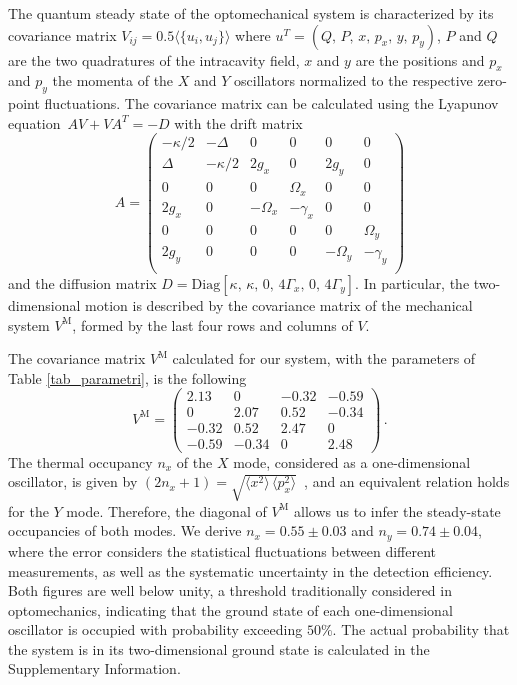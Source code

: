 \documentclass[11pt,floatfix,amssymb,prx,aps,longbibliography,superscriptaddress,nopacs]{revtex4-2}
\newcommand{\Vm}{V^{\scriptscriptstyle{\mathrm{M}}}}
\newcommand{\nX}{n_{\scriptstyle{x}}}
\newcommand{\nY}{n_{\scriptstyle{y}}}
\newcommand{\OmegaX}{\Omega_{\scriptstyle{x}}}
\newcommand{\OmegaY}{\Omega_{\scriptstyle{y}}}
\newcommand{\GY}{\Gamma_{\scriptstyle{y}}}
\newcommand{\GX}{\Gamma_{\scriptstyle{x}}}
\newcommand{\gX}{g_{\scriptstyle{x}}}
\newcommand{\gY}{g_{\scriptstyle{y}}}
\newcommand{\xX}{x}
\newcommand{\xY}{y}
\newcommand{\pX}{p_{\scriptstyle{x}}}
\newcommand{\pY}{p_{\scriptstyle{y}}}
\begin{document}
The quantum steady state of the optomechanical system is characterized by its covariance matrix $V_{ij} = 0.5\langle \{u_i , u_j\} \rangle$ where $u^T = (Q,\,  P,\, \xX,\, \pX,\, \xY,\, \pY)$, $P$ and $Q$ are the two quadratures of the intracavity field, $\xX$ and $\xY$ are the positions and $\pX$ and $\pY$ the momenta of the $X$ and $Y$ oscillators normalized to the respective zero-point fluctuations. The covariance matrix can be calculated using the Lyapunov equation $\,AV+VA^T = -D$ with the drift matrix 
\begin{equation}
    A=
    \left(
    \begin{array}{cccccc}
        -\kappa/2 & -\Delta & 0  & 0 & 0  & 0 \\
         \Delta & -\kappa/2 & 2 \gX  & 0 & 2 \gY  & 0 \\
         0 & 0 & 0  & \OmegaX & 0  & 0 \\
         2 \gX & 0 & -\OmegaX  & -\gamma_x & 0  & 0 \\
         0 & 0 & 0  & 0 & 0  & \OmegaY \\
         2 \gY & 0 & 0  & 0 & -\OmegaY  & -\gamma_y \\
    \end{array}
    \right)
\end{equation}
and the diffusion matrix $D = \mathrm{Diag} [\kappa,\,\kappa,\,0,\,4\GX,\,0,\,4\GY]$. In particular, the two-dimensional motion is described by the covariance matrix of the mechanical system $\Vm$, formed by the last four rows and columns of $V$. 

The covariance matrix $\Vm$ calculated for our system, with the parameters of Table \ref{tab_parametri}, is the following
\begin{equation}
\Vm = 
    \left(
    \begin{array}{cccc}
         2.13 & 0 & -0.32 & -0.59  \\
         0 & 2.07 & 0.52 & -0.34  \\
         -0.32 & 0.52 & 2.47 & 0  \\
         -0.59  & -0.34 & 0 & 2.48 
    \end{array}
    \right)  \, .
\end{equation}
The thermal occupancy $\nX$ of the $X$ mode, considered as a one-dimensional oscillator, is given by $\left(2 \nX+1\right) = \sqrt{\langle \xX^2 \rangle \, \langle \pX^2 \rangle}\,$ \cite{Borkje2023}, and an equivalent relation holds for the $Y$ mode. Therefore, the diagonal of $\Vm$ allows us to infer the steady-state occupancies of both modes. We derive $\nX = 0.55\pm 0.03$ and $\nY = 0.74 \pm 0.04$, where the error considers the statistical fluctuations between different measurements, as well as the systematic uncertainty in the detection efficiency. Both figures are well below unity, a threshold traditionally considered in optomechanics, indicating that the ground state of each one-dimensional oscillator is occupied with probability exceeding $50\%$. The actual probability that the system is in its two-dimensional ground state is calculated in the Supplementary Information.
\end{document}
